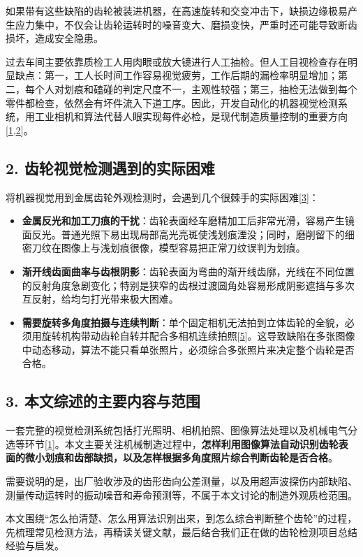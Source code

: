 如果带有这些缺陷的齿轮被装进机器，在高速旋转和交变冲击下，缺损边缘极易产生应力集中，不仅会让齿轮运转时的噪音变大、磨损变快，严重时还可能导致断齿损坏，造成安全隐患。

过去车间主要依靠质检工人用肉眼或放大镜进行人工抽检。但人工目视检查存在明显缺点：第一，工人长时间工作容易视觉疲劳，工作后期的漏检率明显增加；第二，每个人对划痕和磕碰的判定尺度不一，主观性较强；第三，抽检无法做到每个零件都检查，依然会有坏件流入下道工序。因此，开发自动化的机器视觉检测系统，用工业相机和算法代替人眼实现每件必检，是现代制造质量控制的重要方向[\hyperlink{ref:1}{1},\hyperlink{ref:2}{2}]。

\subsection*{2. 齿轮视觉检测遇到的实际困难}
将机器视觉用到金属齿轮外观检测时，会遇到几个很棘手的实际困难[\hyperlink{ref:3}{3}]：
\begin{itemize}
\item \textbf{金属反光和加工刀痕的干扰}：齿轮表面经车磨精加工后非常光滑，容易产生镜面反光。普通光照下易出现局部高光亮斑使浅划痕湮没；同时，磨削留下的细密刀纹在图像上与浅划痕很像，模型容易把正常刀纹误判为划痕。
\item \textbf{渐开线齿面曲率与齿根阴影}：齿轮表面为弯曲的渐开线齿廓，光线在不同位置的反射角度急剧变化；特别是狭窄的齿根过渡圆角处容易形成阴影遮挡与多次互反射，给均匀打光带来极大困难。
\item \textbf{需要旋转多角度拍摄与连续判断}：单个固定相机无法拍到立体齿轮的全貌，必须用旋转机构带动齿轮自转并配合多相机连续拍照[\hyperlink{ref:5}{5}]。这导致缺陷在多张图像中动态移动，算法不能只看单张照片，必须综合多张照片来决定整个齿轮是否合格。

\end{itemize}
\subsection*{3. 本文综述的主要内容与范围}
一套完整的视觉检测系统包括打光照明、相机拍照、图像算法处理以及机械电气分选等环节[\hyperlink{ref:1}{1}]。本文主要关注机械制造过程中，\textbf{怎样利用图像算法自动识别齿轮表面的微小划痕和齿部缺损，以及怎样根据多角度照片综合判断齿轮是否合格}。

需要说明的是，出厂验收涉及的齿形齿向公差测量，以及用超声波探伤内部缺陷、测量传动运转时的振动噪音和寿命预测等，不属于本文讨论的制造外观质检范围。

本文围绕“怎么拍清楚、怎么用算法识别出来，到怎么综合判断整个齿轮”的过程，先梳理常见检测方法，再精读关键文献，最后结合我们正在做的齿轮检测项目总结经验与启发。



